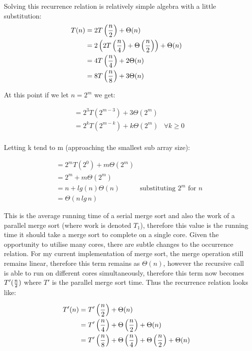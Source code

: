 \documentclass[12pt,twoside,notitlepage]{report}
\begin{document}
Solving this recurrence relation is relatively simple algebra with a little substitution:
\begin{align*}
T(n) &= 2T\left({n \over 2}\right) + \Theta(n) \\
&= 2\left(2T\left({n \over 4}\right) + \Theta\left({n \over 2}\right)\right) + \Theta(n) \\
&= 4T\left({n \over 4}\right) + 2\Theta(n) \\
&= 8T\left({n \over 8}\right) + 3\Theta(n) \\
\end{align*}

At this point if we let $n = 2^{m}$ we get:

\begin{align*}
&= 2^{3}T\left(2^{m-3}\right) + 3\Theta\left(2^{m}\right) \\
&= 2^{k}T\left(2^{m-k}\right) + k\Theta\left(2^{m}\right) & \forall k \geq 0\\
\end{align*}

Letting k tend to m (approaching the smallest sub array size):

\begin{align*}
&= 2^{m}T\left(2^{0}\right) + m\Theta\left(2^{m}\right) \\
&= 2^{m} + m\Theta\left(2^{m}\right) \\
&= n + lg(n)\Theta(n) & \text{substituting $2^{m}$ for $n$} \\
&= \Theta(n\,{lg\,{n}}) 
\end{align*}

This is the average running time of a serial merge sort and also the work of a parallel merge sort (where work is denoted $T_1$), therefore this value is the running time it should take a merge sort to complete on a single core. Given
the opportunity to utilise many cores, there are subtle changes to the occurrence relation. For my current implementation of merge sort, the merge operation still remains linear, therefore this term remains as $\Theta(n)$, however the
recursive call is able to run on different cores simultaneously, therefore this term now becomes $T'({n \over 2})$ where $T'$ is the parallel merge sort time. Thus the recurrence relation looks like:

\begin{align*}
T'(n) &= T'\left({n \over 2}\right) + \Theta(n) \\
&= T'\left({n \over 4}\right) + \Theta\left({n \over 2}\right) + \Theta(n) \\
&= T'\left({n \over 8}\right) + \Theta\left({n \over 4}\right) + \Theta\left({n \over 2}\right) + \Theta(n) \\
\end{align*}
\end{document}
